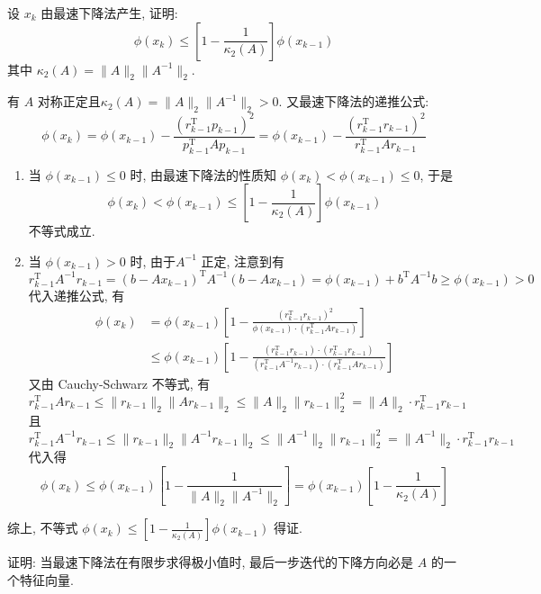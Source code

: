 \documentclass[12pt, answers]{exam}     %
\newcommand{\T}{\mathrm{T}}
\begin{document}
\begin{questions}
\question{}设 $x_k$ 由最速下降法产生, 证明:
\[
\phi(x_k) \leq \left[1 - \frac{1}{\kappa_2(A)}\right] \phi(x_{k-1})
\]
其中 $\kappa_2(A) = \|A\|_2 \|A^{-1}\|_2$. 
\begin{solution}
有 $A$ 对称正定且$\kappa_2(A) = \|A\|_2 \|A^{-1}\|_2 > 0$. 又最速下降法的递推公式:
\[
\phi(x_k) = \phi(x_{k-1}) - \frac{(r_{k-1}^{\T} p_{k-1})^2}{p_{k-1}^{\T} A p_{k-1}} = \phi(x_{k-1}) - \frac{(r_{k-1}^{\T} r_{k-1})^2}{r_{k-1}^{\T} A r_{k-1}}
\]

\begin{enumerate}
    \item 当 $\phi(x_{k-1}) \leq 0$ 时, 
    由最速下降法的性质知 $\phi(x_k) < \phi(x_{k-1}) \leq 0$, 于是
    \[
    \phi(x_k) < \phi(x_{k-1}) \le \left[1 - \frac{1}{\kappa_2(A)}\right] \phi(x_{k-1})
    \]
    不等式成立. 

    \item 当 $\phi(x_{k-1}) > 0$ 时, 
    由于$A^{-1}$ 正定, 注意到有
    \[
    r_{k-1}^{\T} A^{-1} r_{k-1} = (b - A x_{k-1})^{\T} A^{-1} (b - A x_{k-1}) = \phi(x_{k-1}) + b^{\T} A^{-1} b \geq \phi(x_{k-1}) > 0
    \]
    代入递推公式, 有
    \begin{align*}
    \phi(x_k) &= \phi(x_{k-1}) \left[ 1 - \frac{(r_{k-1}^{\T} r_{k-1})^2}{\phi(x_{k-1}) \cdot (r_{k-1}^{\T} A r_{k-1})} \right] \\
    &\leq \phi(x_{k-1}) \left[ 1 - \frac{(r_{k-1}^{\T} r_{k-1}) \cdot (r_{k-1}^{\T} r_{k-1})}{(r_{k-1}^{\T} A^{-1} r_{k-1}) \cdot (r_{k-1}^{\T} A r_{k-1})} \right]
    \end{align*}
    又由 Cauchy-Schwarz 不等式, 有
    \[
    r_{k-1}^{\T} A r_{k-1} \leq \|r_{k-1}\|_2 \|A r_{k-1}\|_2 \leq \|A\|_2 \|r_{k-1}\|_2^2 = \|A\|_2 \cdot r_{k-1}^{\T} r_{k-1}
    \]
    且
    \[
    r_{k-1}^{\T} A^{-1} r_{k-1} \leq \|r_{k-1}\|_2 \|A^{-1} r_{k-1}\|_2 \leq \|A^{-1}\|_2 \|r_{k-1}\|_2^2 = \|A^{-1}\|_2 \cdot r_{k-1}^{\T} r_{k-1}
    \]
    代入得
    \[
    \phi(x_k) \leq \phi(x_{k-1}) \left[ 1 - \frac{1}{\|A\|_2 \|A^{-1}\|_2} \right] = \phi(x_{k-1}) \left[ 1 - \frac{1}{\kappa_2(A)} \right]
    \]
\end{enumerate}
综上, 不等式 $\phi(x_k) \leq \left[1 - \frac{1}{\kappa_2(A)}\right] \phi(x_{k-1})$ 得证. 

\end{solution}


\question{}证明: 当最速下降法在有限步求得极小值时, 最后一步迭代的下降方向必是 \( A \) 的一个特征向量. 


\end{questions}
\end{document}
